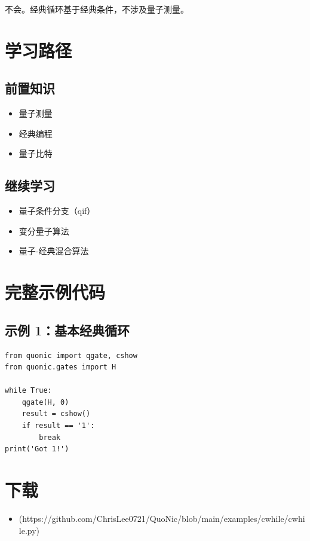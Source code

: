 \documentclass[12pt,a4paper]{article}
\begin{document}
不会。经典循环基于经典条件，不涉及量子测量。

\section{学习路径}

\subsection{前置知识}
\begin{itemize}
  \item 量子测量
  \item 经典编程
  \item 量子比特
\end{itemize}

\subsection{继续学习}
\begin{itemize}
  \item 量子条件分支（qif）
  \item 变分量子算法
  \item 量子-经典混合算法
\end{itemize}

\section{完整示例代码}

\subsection{示例 1：基本经典循环}

\begin{verbatim}
from quonic import qgate, cshow
from quonic.gates import H

while True:
    qgate(H, 0)
    result = cshow()
    if result == '1':
        break
print('Got 1!')
\end{verbatim}

\section{下载}

\begin{itemize}
  \item [cwhile.py](https://github.com/ChrisLee0721/QuoNic/blob/main/examples/cwhile/cwhile.py)
\end{itemize}
\end{document}
